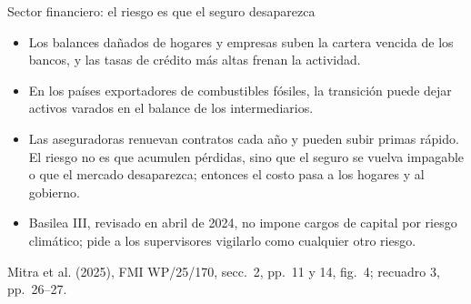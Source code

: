 \documentclass[aspectratio=169,11pt]{beamer}
\newcommand{\fuente}[1]{\par\vfill{\small\color{cGris}#1\par}}
\newcommand{\FMI}{Mitra et al. (2025), FMI WP/25/170}
\begin{document}
\begin{frame}{Sector financiero: el riesgo es que el seguro desaparezca}
  \begin{itemize}
    \item<1-> Los balances dañados de hogares y empresas suben la cartera vencida de los bancos, y las tasas de crédito más altas frenan la actividad.
    \item<2-> En los países exportadores de combustibles fósiles, la transición puede dejar activos varados en el balance de los intermediarios.
    \item<3-> Las aseguradoras renuevan contratos cada año y pueden subir primas rápido. El riesgo no es que acumulen pérdidas, sino que el seguro se vuelva impagable o que el mercado desaparezca; entonces el costo pasa a los hogares y al gobierno.
    \item<4-> Basilea III, revisado en abril de 2024, no impone cargos de capital por riesgo climático; pide a los supervisores vigilarlo como cualquier otro riesgo.
  \end{itemize}
  \fuente{\FMI, secc.~2, pp.~11 y 14, fig.~4; recuadro 3, pp.~26--27.}
\end{frame}
\end{document}

